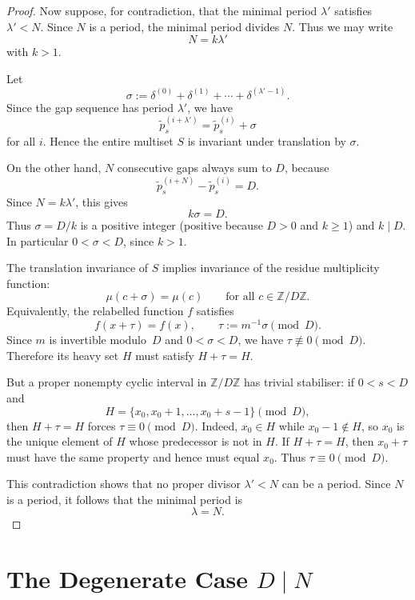 \documentclass[11pt]{article}
\theoremstyle{plain}
\theoremstyle{definition}
\theoremstyle{remark}
\begin{document}
\begin{proof}
Now suppose, for contradiction, that the minimal period \(\lambda'\) satisfies
\(\lambda' < N\).  Since \(N\) is a period, the minimal period divides \(N\).
Thus we may write
\[
    N = k\lambda'
\]
with \(k>1\).

Let
\[
    \sigma := \delta^{(0)} + \delta^{(1)} + \cdots + \delta^{(\lambda'-1)}.
\]
Since the gap sequence has period \(\lambda'\), we have
\[
    \tilde p_s^{(i+\lambda')} = \tilde p_s^{(i)} + \sigma
\]
for all \(i\).  Hence the entire multiset \(S\) is invariant under
translation by \(\sigma\).

On the other hand, \(N\) consecutive gaps always sum to \(D\), because
\[
    \tilde p_s^{(i+N)}-\tilde p_s^{(i)} = D.
\]
Since \(N=k\lambda'\), this gives
\[
    k\sigma = D.
\]
Thus \(\sigma = D/k\) is a positive integer (positive because \(D>0\)
and \(k\ge 1\)) and \(k\mid D\).  In particular \(0 < \sigma < D\),
since \(k>1\).

The translation invariance of \(S\) implies invariance of the residue
multiplicity function:
\[
    \mu(c+\sigma)=\mu(c) \qquad \text{for all } c\in \mathbb{Z}/D\mathbb{Z}.
\]
Equivalently, the relabelled function \(f\) satisfies
\[
    f(x+\tau)=f(x), \qquad \tau := m^{-1}\sigma \pmod D.
\]
Since \(m\) is invertible modulo~\(D\) and \(0<\sigma<D\), we have
\(\tau\not\equiv 0\pmod D\).
Therefore its heavy set \(H\) must satisfy \(H+\tau = H\).

But a proper nonempty cyclic interval in \(\mathbb{Z}/D\mathbb{Z}\) has
trivial stabiliser: if \(0<s<D\) and
\[
    H=\{x_0,x_0+1,\ldots,x_0+s-1\}\pmod D,
\]
then \(H+\tau=H\) forces \(\tau\equiv 0\pmod D\).
Indeed, \(x_0\in H\) while \(x_0-1\notin H\), so \(x_0\) is the unique element
of \(H\) whose predecessor is not in \(H\).  If \(H+\tau=H\), then
\(x_0+\tau\) must have the same property and hence must equal \(x_0\).
Thus \(\tau\equiv0\pmod D\).

This contradiction shows that no proper divisor \(\lambda' < N\) can be a
period.  Since \(N\) is a period, it follows that the minimal period is
\[
    \lambda = N.
\]
\end{proof}

\section{The Degenerate Case \(D \mid N\)}\label{sec:degenerate}
\end{document}
